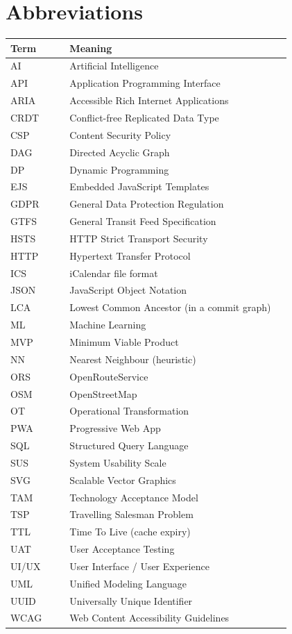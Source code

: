 \chapter*{Abbreviations}

\begin{longtable}{@{}p{0.20\linewidth}p{0.75\linewidth}@{}}
\toprule
\textbf{Term} & \textbf{Meaning} \\
\midrule
AI    & Artificial Intelligence \\
API   & Application Programming Interface \\
ARIA  & Accessible Rich Internet Applications \\
CRDT  & Conflict-free Replicated Data Type \\
CSP   & Content Security Policy \\
DAG   & Directed Acyclic Graph \\
DP    & Dynamic Programming \\
EJS   & Embedded JavaScript Templates \\
GDPR  & General Data Protection Regulation \\
GTFS  & General Transit Feed Specification \\
HSTS  & HTTP Strict Transport Security \\
HTTP  & Hypertext Transfer Protocol \\
ICS   & iCalendar file format \\
JSON  & JavaScript Object Notation \\
LCA   & Lowest Common Ancestor (in a commit graph) \\
ML    & Machine Learning \\
MVP   & Minimum Viable Product \\
NN    & Nearest Neighbour (heuristic) \\
ORS   & OpenRouteService \\
OSM   & OpenStreetMap \\
OT    & Operational Transformation \\
PWA   & Progressive Web App \\
SQL   & Structured Query Language \\
SUS   & System Usability Scale \\
SVG   & Scalable Vector Graphics \\
TAM   & Technology Acceptance Model \\
TSP   & Travelling Salesman Problem \\
TTL   & Time To Live (cache expiry) \\
UAT   & User Acceptance Testing \\
UI/UX & User Interface / User Experience \\
UML   & Unified Modeling Language \\
UUID  & Universally Unique Identifier \\
WCAG  & Web Content Accessibility Guidelines \\
\bottomrule
\end{longtable}
